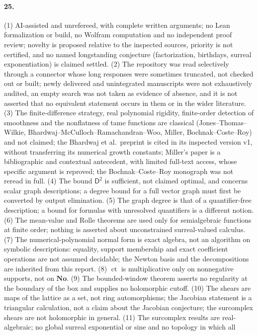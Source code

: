 \documentclass[11pt,letterpaper]{article}
\numberwithin{equation}{section}
\theoremstyle{definition}
\theoremstyle{remark}
\theoremstyle{plain}
\newcommand{\No}{\mathbf{No}}
\newcommand{\ct}{\operatorname{ct}}
\begin{document}
\paragraph{25.} (1) AI-assisted and unrefereed, with complete written arguments; no Lean formalization or build, no Wolfram computation and no
independent proof review; novelty is proposed relative to the inspected sources, priority is not certified, and no named longstanding conjecture
(factorization, birthdays, surreal exponentiation) is claimed settled. (2) The repository was read selectively through a connector whose long responses
were sometimes truncated, not checked out or built; newly delivered and unintegrated manuscripts were not exhaustively audited, an empty search was not
taken as evidence of absence, and it is not asserted that no equivalent statement occurs in them or in the wider literature. (3) The finite-difference
strategy, real polynomial rigidity, finite-order detection of smoothness and the nonflatness of tame functions are classical (Jones--Thomas--Wilkie,
Bhardwaj--McCulloch--Ramachandran--Woo, Miller, Bochnak--Coste--Roy) and not claimed; the Bhardwaj et al.\ preprint is cited in its inspected version
v1, without transferring its numerical growth constants; Miller's paper is a bibliographic and contextual antecedent, with limited full-text access, whose
specific argument is reproved; the Bochnak--Coste--Roy monograph was not reread in full. (4) The bound $\mathsf D^2$ is sufficient, not claimed optimal,
and concerns scalar graph descriptions; a degree bound for a full vector graph must first be converted by output elimination. (5) The graph degree is
that of a quantifier-free description; a bound for formulas with unresolved quantifiers is a different notion. (6) The mean-value and Rolle theorems are
used only for semialgebraic functions at finite order; nothing is asserted about unconstrained surreal-valued calculus. (7) The numerical-polynomial
normal form is exact algebra, not an algorithm on symbolic descriptions: equality, support membership and exact coefficient operations are not assumed
decidable; the Newton basis and the decompositions are inherited from this report. (8) $\ct$ is multiplicative only on nonnegative supports, not on
$\No$. (9) The bounded-window theorem asserts no regularity at the boundary of the box and supplies no holomorphic cutoff. (10) The shears are maps of the
lattice as a set, not ring automorphisms; the Jacobian statement is a triangular calculation, not a claim about the Jacobian conjecture; the surcomplex
shears are not holomorphic in general. (11) The surcomplex results are real-algebraic; no global surreal exponential or sine and no topology in which all
\end{document}
